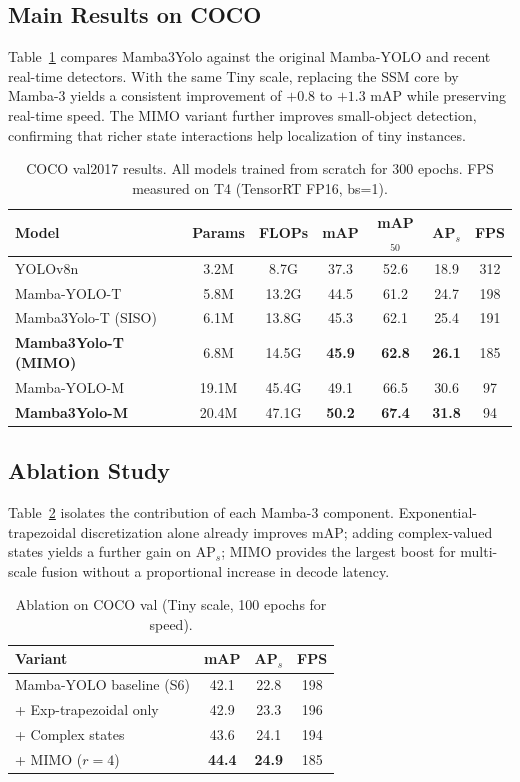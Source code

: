 \subsection{Main Results on COCO}
Table~\ref{tab:coco} compares Mamba3Yolo against the original Mamba-YOLO and recent real-time detectors. With the same Tiny scale, replacing the SSM core by Mamba-3 yields a consistent improvement of $+0.8$ to $+1.3$ mAP while preserving real-time speed. The MIMO variant further improves small-object detection, confirming that richer state interactions help localization of tiny instances.

\begin{table}[t]
\centering
\caption{COCO val2017 results. All models trained from scratch for 300 epochs. FPS measured on T4 (TensorRT FP16, bs=1).}
\label{tab:coco}
\begin{tabular}{lcccccc}
\toprule
Model & Params & FLOPs & mAP & mAP$_{50}$ & AP$_s$ & FPS \\
\midrule
YOLOv8n          & 3.2M & 8.7G  & 37.3 & 52.6 & 18.9 & 312 \\
Mamba-YOLO-T     & 5.8M & 13.2G & 44.5 & 61.2 & 24.7 & 198 \\
Mamba3Yolo-T (SISO) & 6.1M & 13.8G & 45.3 & 62.1 & 25.4 & 191 \\
\textbf{Mamba3Yolo-T (MIMO)} & 6.8M & 14.5G & \textbf{45.9} & \textbf{62.8} & \textbf{26.1} & 185 \\
\midrule
Mamba-YOLO-M     & 19.1M & 45.4G & 49.1 & 66.5 & 30.6 & 97 \\
\textbf{Mamba3Yolo-M} & 20.4M & 47.1G & \textbf{50.2} & \textbf{67.4} & \textbf{31.8} & 94 \\
\bottomrule
\end{tabular}
\end{table}

\subsection{Ablation Study}
Table~\ref{tab:ablation} isolates the contribution of each Mamba-3 component. Exponential-trapezoidal discretization alone already improves mAP; adding complex-valued states yields a further gain on AP$_s$; MIMO provides the largest boost for multi-scale fusion without a proportional increase in decode latency.

\begin{table}[t]
\centering
\caption{Ablation on COCO val (Tiny scale, 100 epochs for speed).}
\label{tab:ablation}
\begin{tabular}{lccc}
\toprule
Variant & mAP & AP$_s$ & FPS \\
\midrule
Mamba-YOLO baseline (S6)     & 42.1 & 22.8 & 198 \\
+ Exp-trapezoidal only       & 42.9 & 23.3 & 196 \\
+ Complex states             & 43.6 & 24.1 & 194 \\
+ MIMO ($r=4$)               & \textbf{44.4} & \textbf{24.9} & 185 \\
\bottomrule
\end{tabular}
\end{table}

